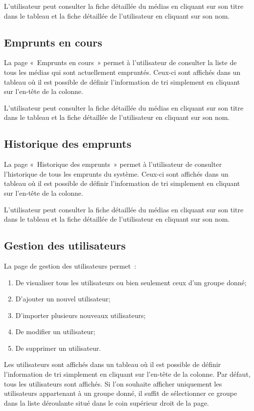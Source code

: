 \documentclass[letter, 11pt]{report}
\begin{document}
L'utilisateur peut consulter la fiche détaillée du médias en cliquant sur son titre dans le tableau et la fiche détaillée de l'utilisateur en cliquant sur son nom.

\subsection{Emprunts en cours}
La page «~Emprunts en cours~» permet à l'utilisateur de consulter la liste de tous les médias qui sont actuellement empruntés. Ceux-ci sont affichés dans un tableau où il est possible de définir l'information de tri simplement en cliquant sur l'en-tête de la colonne.

L'utilisateur peut consulter la fiche détaillée du médias en cliquant sur son titre dans le tableau et la fiche détaillée de l'utilisateur en cliquant sur son nom.

\subsection{Historique des emprunts}
La page «~Historique des emprunts~» permet à l'utilisateur de consulter l'historique de tous les emprunts du système. Ceux-ci sont affichés dans un tableau où il est possible de définir l'information de tri simplement en cliquant sur l'en-tête de la colonne.

L'utilisateur peut consulter la fiche détaillée du médias en cliquant sur son titre dans le tableau et la fiche détaillée de l'utilisateur en cliquant sur son nom.

\subsection{Gestion des utilisateurs}
La page de gestion des utilisateurs permet~:
\begin{enumerate}
	\item De visualiser tous les utilisateurs ou bien seulement ceux d'un groupe donné;
	\item D'ajouter un nouvel utilisateur;
	\item D'importer plusieurs nouveaux utilisateurs;
	\item De modifier un utilisateur;
	\item De supprimer un utilisateur.
\end{enumerate}

Les utilisateurs sont affichés dans un tableau où il est possible de définir l'information de tri simplement en cliquant sur l'en-tête de la colonne. Par défaut, tous les utilisateurs sont affichés. Si l'on souhaite afficher uniquement les utilisateurs appartenant à un groupe donné, il suffit de sélectionner ce groupe dans la liste déroulante situé dans le coin supérieur droit de la page.
\end{document}

